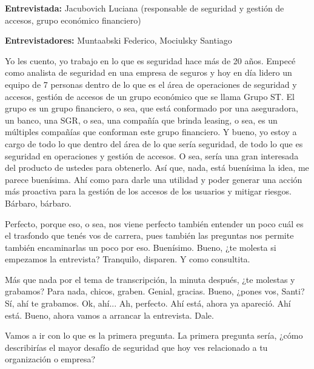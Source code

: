 
\textbf{Entrevistada:} Jacubovich Luciana (responsable de seguridad y gestión de accesos, grupo económico financiero)

\textbf{Entrevistadores:} Muntaabski Federico, Mociulsky Santiago

\begin{description}[leftmargin=0cm, labelsep=0.5cm]
    \item[\textbf{JACUBOVICH LUCIANA:}] Yo les cuento, yo trabajo en lo que es seguridad hace más de 20 años. Empecé como analista de seguridad en una empresa de seguros y hoy en día lidero un equipo de 7 personas dentro de lo que es el área de operaciones de seguridad y accesos, gestión de accesos de un grupo económico que se llama Grupo ST. El grupo es un grupo financiero, o sea, que está conformado por una aseguradora, un banco, una SGR, o sea, una compañía que brinda leasing, o sea, es un múltiples compañías que conforman este grupo financiero. Y bueno, yo estoy a cargo de todo lo que dentro del área de lo que sería seguridad, de todo lo que es seguridad en operaciones y gestión de accesos. O sea, sería una gran interesada del producto de ustedes para obtenerlo. Así que, nada, está buenísima la idea, me parece buenísima. Ahí como para darle una utilidad y poder generar una acción más proactiva para la gestión de los accesos de los usuarios y mitigar riesgos. Bárbaro, bárbaro.

    \item[\textbf{MUNTAABSKI FEDERICO:}] Perfecto, porque eso, o sea, nos viene perfecto también entender un poco cuál es el trasfondo que tenés vos de carrera, pues también las preguntas nos permite también encaminarlas un poco por eso. Buenísimo. Bueno, ¿te molesta si empezamos la entrevista? Tranquilo, disparen. Y como consultita.

    \item[\textbf{MOCIULSKY SANTIAGO:}] Más que nada por el tema de transcripción, la minuta después, ¿te molestas y grabamos? Para nada, chicos, graben. Genial, gracias. Bueno, ¿pones vos, Santi? Sí, ahí te grabamos. Ok, ahí... Ah, perfecto. Ahí está, ahora ya apareció. Ahí está. Bueno, ahora vamos a arrancar la entrevista. Dale.

    \item[\textbf{MUNTAABSKI FEDERICO:}] Vamos a ir con lo que es la primera pregunta. La primera pregunta sería, ¿cómo describirías el mayor desafío de seguridad que hoy ves relacionado a tu organización o empresa?


\end{description}

